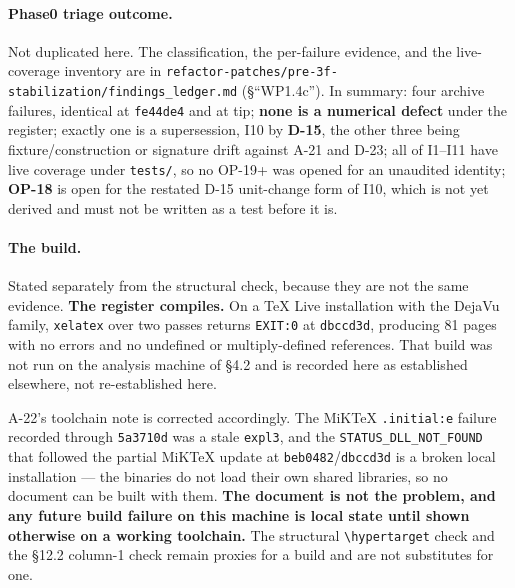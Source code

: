 \documentclass[
  10pt,
]{article}
\begin{document}
\paragraph{Phase0 triage outcome.}
Not duplicated here. The classification, the per-failure evidence, and the live-coverage inventory are in \texttt{refactor-patches/\allowbreak{}pre-3f-stabilization/\allowbreak{}findings\_ledger.md} (§``WP1.4c''). In summary: four archive failures, identical at \texttt{fe44de4} and at tip; \textbf{none is a numerical defect} under the register; exactly one is a supersession, I10 by \textbf{D-15}, the other three being fixture/construction or signature drift against A-21 and D-23; all of I1--I11 have live coverage under \texttt{tests/}, so no OP-19+ was opened for an unaudited identity; \textbf{OP-18} is open for the restated D-15 unit-change form of I10, which is not yet derived and must not be written as a test before it is.

\paragraph{The build.}
Stated separately from the structural check, because they are not the same evidence. \textbf{The register compiles.} On a TeX Live installation with the DejaVu family, \texttt{xelatex} over two passes returns \texttt{EXIT:0} at \texttt{dbccd3d}, producing 81 pages with no errors and no undefined or multiply-defined references. That build was not run on the analysis machine of §4.2 and is recorded here as established elsewhere, not re-established here.

A-22's toolchain note is corrected accordingly. The MiKTeX \texttt{.initial:e} failure recorded through \texttt{5a3710d} was a stale \texttt{expl3}, and the \texttt{STATUS\_DLL\_NOT\_FOUND} that followed the partial MiKTeX update at \texttt{beb0482}/\texttt{dbccd3d} is a broken local installation --- the binaries do not load their own shared libraries, so no document can be built with them. \textbf{The document is not the problem, and any future build failure on this machine is local state until shown otherwise on a working toolchain.} The structural \texttt{\textbackslash hypertarget} check and the §12.2 column-1 check remain proxies for a build and are not substitutes for one.
\end{document}

